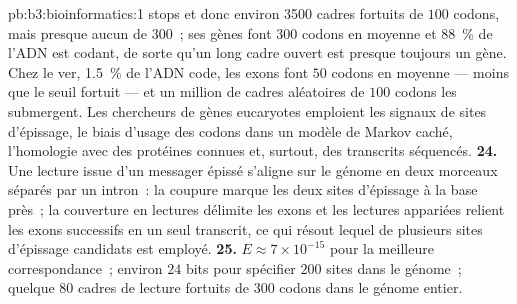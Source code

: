 \begin{solution}{pb:b3:bioinformatics:1}
stops et donc environ \num{3500} cadres fortuits de $100$ codons, mais
presque aucun de $300$~; ses gènes font $300$ codons en moyenne et
\qty{88}{\%} de l'ADN est codant, de sorte qu'un long cadre ouvert est
presque toujours un gène. Chez le ver, \qty{1.5}{\%} de l'ADN code, les
exons font $50$ codons en moyenne --- moins que le seuil fortuit --- et
un million de cadres aléatoires de $100$ codons les submergent. Les
chercheurs de gènes eucaryotes emploient les signaux de sites
d'épissage, le biais d'usage des codons dans un modèle de Markov caché,
l'homologie avec des protéines connues et, surtout, des transcrits
séquencés.
\textbf{24.} Une lecture issue d'un messager épissé s'aligne sur le
génome en deux morceaux séparés par un intron~: la coupure marque les
deux sites d'épissage à la base près~; la couverture en lectures
délimite les exons et les lectures appariées relient les exons
successifs en un seul transcrit, ce qui résout lequel de plusieurs sites
d'épissage candidats est employé.
\textbf{25.} $E \approx 7\times 10^{-15}$ pour la meilleure
correspondance~; environ $24$ bits pour spécifier $200$ sites dans le
génome~; quelque $80$ cadres de lecture fortuits de $300$ codons dans
le génome entier.
\end{solution}
